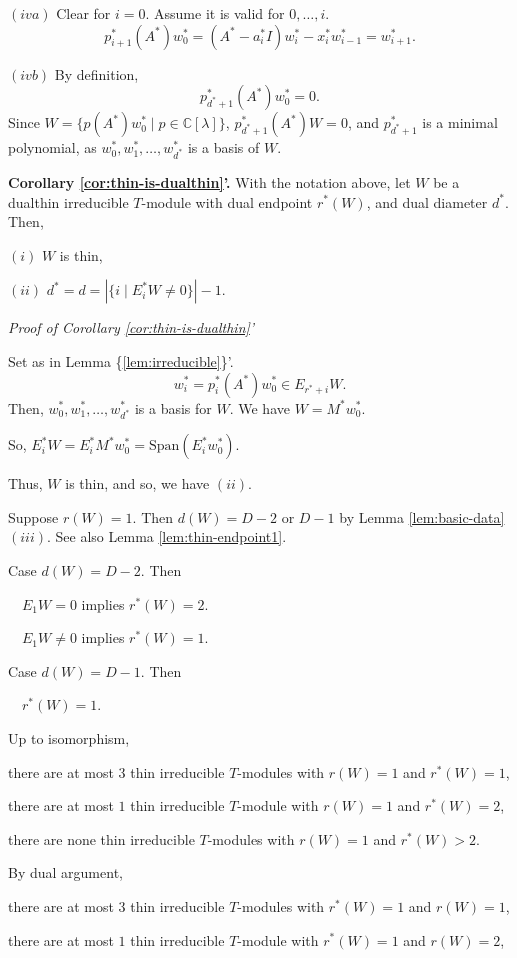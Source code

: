 \documentclass[
]{book}
\theoremstyle{definition}
\theoremstyle{definition}
\theoremstyle{definition}
\theoremstyle{definition}
\theoremstyle{remark}
\begin{document}
\((iva)\) Clear for \(i=0\). Assume it is valid for \(0, \ldots, i\).
\[p^*_{i+1}(A^*)w^*_0 = (A^*-a^*_iI)w^*_i - x^*_iw^*_{i-1} = w^*_{i+1}.\]

\((ivb)\) By definition,
\[p^*_{d^*+1}(A^*)w^*_0 = 0.\]
Since \(W = \{p(A^*)w^*_0\mid p\in \mathbb{C}[\lambda]\}\), \(p^*_{d^*+1}(A^*)W = 0\), and \(p^*_{d^*+1}\) is a minimal polynomial, as \(w^*_0, w^*_1, \ldots, w^*_{d^*}\) is a basis of \(W\).

\textbf{Corollary \ref{cor:thin-is-dualthin}'.}
With the notation above, let \(W\) be a dualthin irreducible \(T\)-module with dual endpoint \(r^*(W)\), and dual diameter \(d^*\). Then,

\((i)\) \(W\) is thin,

\((ii)\) \(d^* = d = |\{i\mid E^*_iW\neq 0\}| -1\).

\emph{Proof of Corollary \ref{cor:thin-is-dualthin}'}

Set as in Lemma \{\ref{lem:irreducible}\}'.
\[w^*_i = p^*_i(A^*)w^*_0 \in E_{r^*+i}W.\]
Then, \(w^*_0, w^*_1, \ldots, w^*_{d^*}\) is a basis for \(W\). We have \(W = M^*w^*_0\).

So, \(E^*_iW = E^*_iM^*w^*_0 = \mathrm{Span}(E^*_iw^*_0)\).

Thus, \(W\) is thin, and so, we have \((ii)\).

\hfill\break

Suppose \(r(W) = 1\). Then \(d(W) = D-2\) or \(D-1\) by Lemma \ref{lem:basic-data} \((iii)\). See also Lemma \ref{lem:thin-endpoint1}.

Case \(d(W) = D-2\). Then

\(\quad E_1W = 0\) implies \(r^*(W) = 2\).

\(\quad E_1W\neq 0\) implies \(r^*(W) = 1\).

Case \(d(W) = D-1\). Then

\(\quad r^*(W) = 1\).

Up to isomorphism,

there are at most \(3\) thin irreducible \(T\)-modules with \(r(W) =1\) and \(r^*(W)=1\),

there are at most \(1\) thin irreducible \(T\)-module with \(r(W) = 1\) and \(r^*(W)=2\),

there are none thin irreducible \(T\)-modules with \(r(W) = 1\) and \(r^*(W) > 2\).

By dual argument,

there are at most \(3\) thin irreducible \(T\)-modules with \(r^*(W) =1\) and \(r(W)=1\),

there are at most \(1\) thin irreducible \(T\)-module with \(r^*(W) = 1\) and \(r(W)=2\),
\end{document}
